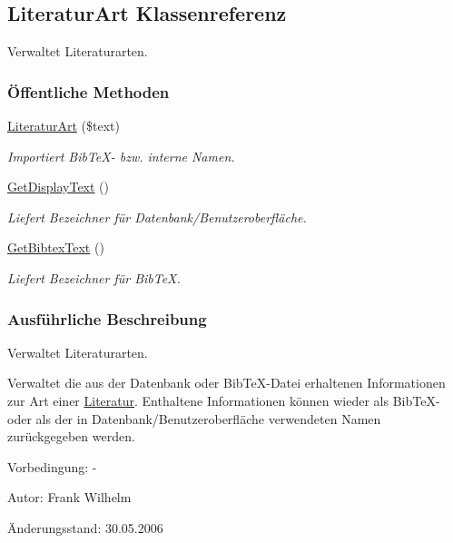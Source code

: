 \hypertarget{classLiteraturArt}{
\subsection{Literatur\-Art Klassenreferenz}
\label{classLiteraturArt}
}
Verwaltet Literaturarten.  


\subsubsection*{\"{O}ffentliche Methoden}
\begin{CompactItemize}
\item 
\hyperlink{classLiteraturArt_b3312217430531ed7821a46a39c49af7}{Literatur\-Art} (\$text)
\begin{CompactList}\small\item\em Importiert Bib\-Te\-X- bzw. interne Namen. \item\end{CompactList}\item 
\hyperlink{classLiteraturArt_43f747a6c5d840a22ddcd7e46d27cba0}{Get\-Display\-Text} ()
\begin{CompactList}\small\item\em Liefert Bezeichner für Datenbank/Benutzeroberfläche. \item\end{CompactList}\item 
\hyperlink{classLiteraturArt_01e1a2acd95df1ae0bb22e57b70a63de}{Get\-Bibtex\-Text} ()
\begin{CompactList}\small\item\em Liefert Bezeichner für Bib\-Te\-X. \item\end{CompactList}\end{CompactItemize}


\subsubsection{Ausf\"{u}hrliche Beschreibung}
Verwaltet Literaturarten. 

Verwaltet die aus der Datenbank oder Bib\-Te\-X-Datei erhaltenen Informationen zur Art einer \hyperlink{classLiteratur}{Literatur}. Enthaltene Informationen können wieder als Bib\-Te\-X- oder als der in Datenbank/Benutzeroberfläche verwendeten Namen zurückgegeben werden. \begin{Desc}
\item[Vorbedingung:]-\end{Desc}
\begin{Desc}
\item[Autor:]Frank Wilhelm \end{Desc}
\begin{Desc}
\item[Änderungsstand:]30.05.2006 \end{Desc}




